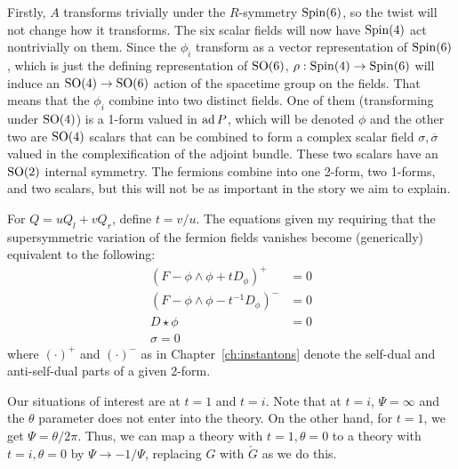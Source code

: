 	Firstly, $A$ transforms trivially under the $R$-symmetry $\mathrm{Spin}(6)$, so the twist will not change how it transforms. The six scalar fields will now have $\mathrm{Spin}(4)$ act nontrivially on them. Since the $\phi_i$ transform as a vector representation of $\mathrm{Spin}(6)$, which is just the defining representation of $\mathrm{SO}(6)$, $\rho: \mathrm{Spin}(4) \to \mathrm{Spin}(6)$ will induce an $\mathrm{SO}(4) \to \mathrm{SO}(6)$ action of the spacetime group on the fields. That means that the $\phi_i$ combine into two distinct fields. One of them (transforming under $\mathrm{SO}(4)$) is a 1-form valued in $\mathrm{ad}\, P$, which will be denoted $\phi$ and the other two are $\mathrm{SO}(4)$ scalars that can be combined to form a complex scalar field $\sigma, \overline \sigma$ valued in the complexification of the adjoint bundle. These two scalars have an $\mathrm{SO}(2)$ internal symmetry. The fermions combine into one 2-form, two 1-forms, and two scalars, but this will not be as important in the story we aim to explain.
	
	For $Q = u Q_l + v Q_r$, define $t = v/u$. The equations given my requiring that the supersymmetric variation of the fermion fields vanishes become (generically) equivalent to the following:
	\begin{equation}
		\begin{aligned}
			(F - \phi \wedge \phi + t D_\phi)^+ &= 0\\
			(F - \phi \wedge \phi - t^{-1} D_\phi)^- &= 0\\
			D \star \phi &= 0\\
			\sigma = 0
		\end{aligned}
	\end{equation}
	where $(\cdot)^+$ and $(\cdot)^-$ as in Chapter~\ref{ch:instantons} denote the self-dual and anti-self-dual parts of a given 2-form. 
	
	Our situations of interest are at $t=1$ and $t=i$. Note that at $t = i$, $\Psi = \infty$ and the $\theta$ parameter does not enter into the theory. On the other hand, for $t = 1$, we get $\Psi = \theta/2\pi$. Thus, we can map a theory with $t=1, \theta=0$ to a theory with $t = i, \theta = 0$ by $\Psi \to -1/\Psi$, replacing $G$ with $\check G$ as we do this.
	
